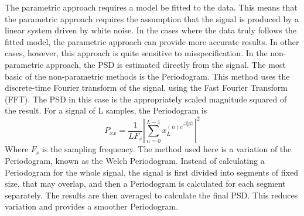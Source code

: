 \documentclass[12pt, a4paper, fleqn]{memoir}%
\begin{document}
The parametric approach requires a model be fitted to the data. This means that the parametric approach requires the assumption that the signal is produced by a linear system driven by white noise. In the cases where the data truly follows the fitted model, the parametric approach can provide more accurate results. In other cases, however, this approach is quite sensitive to misspecification. In the non-parametric approach, the PSD is estimated directly from the signal. The most basic of the non-parametric methods is the Periodogram. This method uses the discrete-time Fourier transform of the signal, using the Fast Fourier Transform (FFT). The PSD in this case is the appropriately scaled magnitude squared of the result.
For a signal of L samples, the Periodogram is
$$P_{xx}=\frac{1}{LF_s}|\sum_{n=0}^{L-1}x_L^{(n)e^{\frac{-j2\pi fn}{F_s}}}|^{2}$$
Where $F_s$ is the sampling frequency.
The method used here is a variation of the Periodogram, known as the Welch Periodogram. Instead of calculating a Periodogram for the whole signal, the signal is first divided into segments of fixed size, that may overlap, and then a Periodogram is calculated for each segment separately. The results are then averaged to calculate the final PSD. This reduces variation and provides a smoother Periodogram\cite{john1996digital}.
\end{document}
